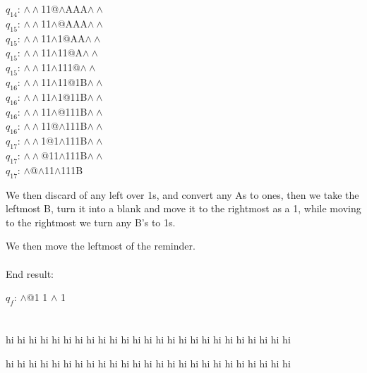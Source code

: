 \documentclass[a4paper]{article} %
\begin{document}
\begin{tasks}[label={(\roman*)},label-width={0.7cm},before-skip = -\parskip , %
            after-skip = -\parskip,
            after-item-skip = -\parskip]
            $q_{14}$: $\land\land$11@$\land$AAA$\land\land$\\
            $q_{15}$: $\land\land$11$\land$@AAA$\land\land$\\ 
            $q_{15}$: $\land\land$11$\land$1@AA$\land\land$\\
            $q_{15}$: $\land\land$11$\land$11@A$\land\land$\\ 
            $q_{15}$: $\land\land$11$\land$111@$\land\land$\\
            $q_{16}$: $\land\land$11$\land$11@1B$\land\land$\\
            $q_{16}$: $\land\land$11$\land$1@11B$\land\land$\\
            $q_{16}$: $\land\land$11$\land$@111B$\land\land$\\
            $q_{16}$: $\land\land$11@$\land$111B$\land\land$\\
            $q_{17}$: $\land\land$1@1$\land$111B$\land\land$\\
            $q_{17}$: $\land\land$@11$\land$111B$\land\land$\\
            $q_{17}$: $\land$@$\land$11$\land$111B

            \task
            We then discard of any left over 1s, and convert any As to ones, then we take the leftmost B, turn it into a blank and move it to the rightmost as a 1, while moving to the rightmost we turn any B's to 1s.

            \task
            We then move the leftmost of the reminder.\\\\End result:

            $q_{f}$: $\land$@1 1 $\land$ 1
        \end{tasks}
        \section{}
        \begin{tasks}[label={\bfseries\MakeUppercase(\Alph*)},label-width={0.7cm}]
        \task
        hi hi hi hi hi hi hi hi hi hi hi hi hi hi hi hi hi hi hi hi hi hi hi hi hi

        \task
        hi hi hi hi hi hi hi hi hi hi hi hi hi hi hi hi hi hi hi hi hi hi hi hi hi
        \end{tasks}
\end{document}
